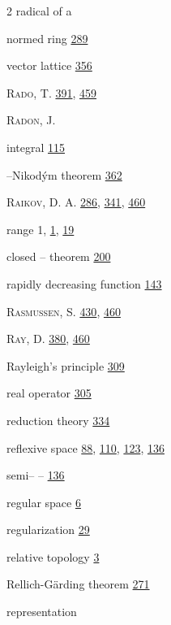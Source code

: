 \begin{multicols}{2}
\noindent radical of a\par
\hspace*{1.1em}normed ring \hyperlink{page.289}{289}\par
\hspace*{1.1em}vector lattice \hyperlink{page.356}{356}\par
\noindent \textsc{Rado}, T. \hyperlink{page.391}{391}, \hyperlink{page.459}{459}\par
\noindent \textsc{Radon}, J.\par
\hspace*{1.1em}integral \hyperlink{page.115}{115}\par
\hspace*{1.1em}--Nikodým theorem \hyperlink{page.362}{362}\par
\noindent \textsc{Raikov}, D. A. \hyperlink{page.286}{286}, \hyperlink{page.341}{341}, \hyperlink{page.460}{460}\par
\noindent range 1, \hyperlink{page.1}{1}, \hyperlink{page.19}{19}\par
\hspace*{1.1em}closed -- theorem \hyperlink{page.200}{200}\par
\noindent rapidly decreasing function \hyperlink{page.143}{143}\par
\noindent \textsc{Rasmussen}, S. \hyperlink{page.430}{430}, \hyperlink{page.460}{460}\par
\noindent \textsc{Ray}, D. \hyperlink{page.380}{380}, \hyperlink{page.460}{460}\par
\noindent Rayleigh's principle \hyperlink{page.309}{309}\par
\noindent real operator \hyperlink{page.305}{305}\par
\noindent reduction theory \hyperlink{page.334}{334}\par
\noindent reflexive space \hyperlink{page.88}{88}, \hyperlink{page.110}{110}, \hyperlink{page.123}{123}, \hyperlink{page.136}{136}\par
\hspace*{1.1em}semi-- -- \hyperlink{page.136}{136}\par
\noindent regular space \hyperlink{page.6}{6}\par
\noindent regularization \hyperlink{page.29}{29}\par
\noindent relative topology \hyperlink{page.3}{3}\par
\noindent Rellich-Gärding theorem \hyperlink{page.271}{271}\par
\noindent representation\par

\end{multicols}
